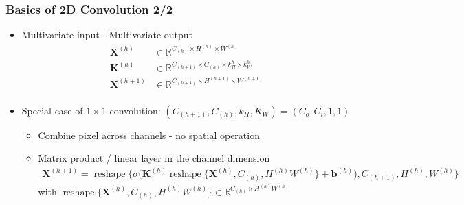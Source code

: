 \documentclass[pressentation,10pt,aspectratio=169,xcolor=table, colorlinks=true]{beamer}
\DeclareMathOperator{\reshape}{reshape}
\begin{document}
\begin{frame}
  \frametitle{Basics of 2D Convolution 2/2}
  \begin{itemize}
  \item Multivariate input - Multivariate output
    \begin{align*}
      \mathbf{X}^{(h)} & \in {} \mathbb{R}^{C_{(h)} \times H^{(h)} \times W^{(h)}}\\
      \mathbf{K}^{(h)} & \in {} \mathbb{R}^{C_{(h+1)}\times C_{(h)} \times k_{H}^h \times k_{W}^h}\\
      \mathbf{X}^{(h+1)}& \in {} \mathbb{R}^{C_{(h+1)} \times H^{(h+1)} \times W^{(h+1)}}\\
    \end{align*}
  \item Special case of \(1\times 1\) convolution: \((C_{(h+1)}, C_{(h)}, k_H, K_W) = (C_o, C_i,1,1)\)
    \begin{itemize}
      \item Combine pixel across channels - no spatial operation
      \item Matrix product / linear layer in the channel dimension
    \begin{align*}
      \mathbf{X}^{(h+1)} = \reshape\bigg\{\sigma\big(\mathbf{K}^{(h)}\reshape\big\{\mathbf{X}^{(h)}, C_{(h)}, H^{(h)}W^{(h)}\big\}+\mathbf{b}^{(h)}\big), C_{(h+1)}, H^{(h)},W^{(h)}\bigg\}
    \end{align*}
    with \(\reshape\big\{\mathbf{X}^{(h)}, C_{(h)}, H^{(h)}W^{(h)}\big\}\in\mathbb{R}^{C_{(h)}\times H^{(h)}W^{(h)}}\)
      
    \end{itemize}
  \end{itemize}
\end{frame}
\end{document}
